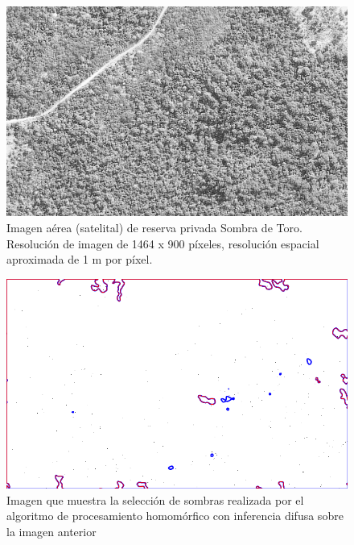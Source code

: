 \begin{figure}[h!]
    \includegraphics[width=\textwidth]{Imagenes/Homomorfico/ST2.png}
     \hfill
     \caption{Imagen aérea (satelital) de reserva privada Sombra de Toro. Resolución de imagen de 1464 x 900 píxeles, resolución espacial aproximada de  1 m por píxel.}
    \label{ST2_gris}
\end{figure}

\begin{figure}[h!]
    \includegraphics[width=\textwidth]{Imagenes/Homomorfico/ST2_fuzzy.png}
     \hfill
     \caption{Imagen que muestra la selección de sombras realizada por el algoritmo de procesamiento homomórfico con inferencia difusa sobre la imagen anterior}
    \label{ST2_difuso}
\end{figure}

